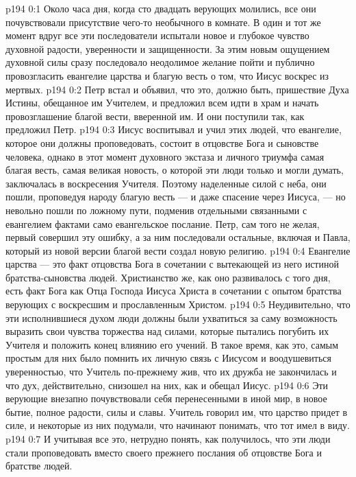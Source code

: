 \author{Комиссия срединников}
\vs p194 0:1 Около часа дня, когда сто двадцать верующих молились, все они почувствовали присутствие чего\hyp{}то необычного в комнате. В один и тот же момент вдруг все эти последователи испытали новое и глубокое чувство духовной радости, уверенности и защищенности. За этим новым ощущением духовной силы сразу последовало неодолимое желание пойти и публично провозгласить евангелие царства и благую весть о том, что Иисус воскрес из мертвых.
\vs p194 0:2 Петр встал и объявил, что это, должно быть, пришествие Духа Истины, обещанное им Учителем, и предложил всем идти в храм и начать провозглашение благой вести, вверенной им. И они поступили так, как предложил Петр.
\vs p194 0:3 \pc Иисус воспитывал и учил этих людей, что евангелие, которое они должны проповедовать, состоит в отцовстве Бога и сыновстве человека, однако в этот момент духовного экстаза и личного триумфа самая благая весть, самая великая новость, о которой эти люди только и могли думать, заключалась в  воскресения Учителя. Поэтому наделенные силой с неба, они пошли, проповедуя народу благую весть --- и даже спасение через Иисуса, --- но невольно пошли по ложному пути, подменив отдельными связанными с евангелием фактами само евангельское послание. Петр, сам того не желая, первый совершил эту ошибку, а за ним последовали остальные, включая и Павла, который из новой версии благой вести создал новую религию.
\vs p194 0:4 Евангелие царства --- это факт отцовства Бога в сочетании с вытекающей из него истиной братства\hyp{}сыновства людей. Христианство же, как оно развивалось с того дня, есть факт Бога как Отца Господа Иисуса Христа в сочетании с опытом братства верующих с воскресшим и прославленным Христом.
\vs p194 0:5 Неудивительно, что эти исполнившиеся духом люди должны были ухватиться за саму возможность выразить свои чувства торжества над силами, которые пытались погубить их Учителя и положить конец влиянию его учений. В такое время, как это, самым простым для них было помнить их личную связь с Иисусом и воодушевиться уверенностью, что Учитель по\hyp{}прежнему жив, что их дружба не закончилась и что дух, действительно, снизошел на них, как и обещал Иисус.
\vs p194 0:6 Эти верующие внезапно почувствовали себя перенесенными в иной мир, в новое бытие, полное радости, силы и славы. Учитель говорил им, что царство придет в силе, и некоторые из них подумали, что начинают понимать, что тот имел в виду.
\vs p194 0:7 И учитывая все это, нетрудно понять, как получилось, что эти люди стали проповедовать  вместо своего прежнего послания об отцовстве Бога и братстве людей.
